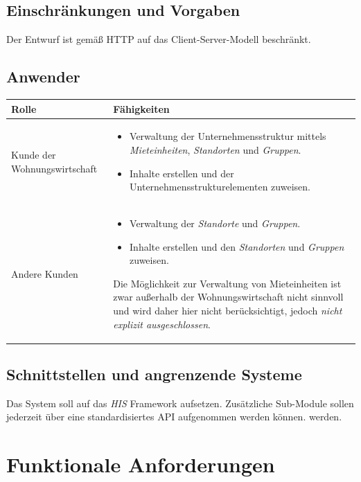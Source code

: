 \documentclass[a4paper]{article}
\begin{document}
	\subsection{Einschränkungen und Vorgaben}
	Der Entwurf ist gemäß HTTP auf das Client-Server-Modell beschränkt.
	
	\subsection{Anwender}	
	\begin{tabular}{|p{}|p{}|}
	\hline
	Rolle & Fähigkeiten \\
	\hline
	Kunde der Wohnungswirtschaft &
		\begin{itemize}
		\item Verwaltung der Unternehmensstruktur mittels \emph{Mieteinheiten}, \emph{Standorten} und \emph{Gruppen}.
		\item Inhalte erstellen und der Unternehmensstrukturelementen zuweisen.
		\end{itemize} \\
	\hline
	Andere Kunden & 
		\begin{itemize}
		\item Verwaltung der \emph{Standorte} und \emph{Gruppen}.
		\item Inhalte erstellen und den \emph{Standorten} und \emph{Gruppen} zuweisen.
		\end{itemize}
		Die Möglichkeit zur Verwaltung von Mieteinheiten ist zwar außerhalb der Wohnungswirtschaft nicht sinnvoll und wird daher hier nicht berücksichtigt, jedoch \emph{nicht explizit ausgeschlossen}. \\
	\hline
	\end{tabular}
	\subsection{Schnittstellen und angrenzende Systeme}
	Das System soll auf das \emph{HIS} Framework aufsetzen.
	Zusätzliche Sub-Module sollen jederzeit über eine standardisiertes API aufgenommen werden können. werden.
	
	\section{Funktionale Anforderungen}
\end{document}
